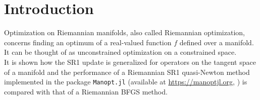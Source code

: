 \chapter{Introduction}

Optimization on Riemannian manifolds, also called Riemannian optimization, concerns finding an optimum of a real-valued function $f$ defined over a manifold. It can be thought of as unconstrained optimization on a constrained space. \\

It is shown how the SR1 update is generalized for operators on the tangent space of a manifold and the performance of a Riemannian SR1 quasi-Newton method implemented in the package \lstinline!Manopt.jl! (available at \url{https://manoptjl.org}, \cite{Bergmann:2019}) is compared with that of a Riemannian BFGS method.
